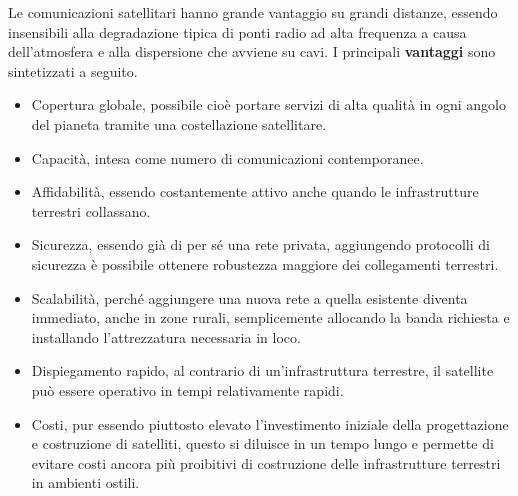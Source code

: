 \documentclass[a4paper]{article}
\begin{document}
			Le comunicazioni satellitari hanno grande vantaggio su grandi distanze, essendo insensibili alla degradazione tipica di ponti radio ad alta frequenza a causa dell'atmosfera e alla dispersione che avviene su cavi.
			I principali {\bf vantaggi} sono sintetizzati a seguito. 
			\begin{itemize}
				\item Copertura globale, possibile cioè portare servizi di alta qualità in ogni angolo del pianeta tramite una costellazione satellitare. 
				\item Capacità, intesa come numero di comunicazioni contemporanee.
				\item Affidabilità, essendo costantemente attivo anche quando le infrastrutture terrestri collassano.
				\item Sicurezza, essendo già di per sé una rete privata, aggiungendo protocolli di sicurezza è possibile ottenere robustezza maggiore dei collegamenti terrestri.
				\item Scalabilità, perché aggiungere una nuova rete a quella esistente diventa immediato, anche in zone rurali, semplicemente allocando la banda richiesta e installando l'attrezzatura necessaria in loco.
				\item Dispiegamento rapido, al contrario di un'infrastruttura terrestre, il satellite può essere operativo in tempi relativamente rapidi.				
				\item Costi, pur essendo piuttosto elevato l'investimento iniziale della progettazione e costruzione di satelliti, questo si diluisce in un tempo lungo e permette di evitare costi ancora più proibitivi di costruzione delle infrastrutture terrestri in ambienti ostili.				
			\end{itemize} 
		
\end{document}
